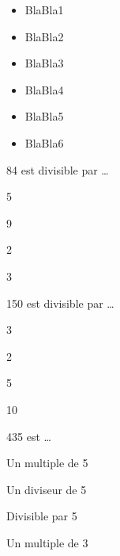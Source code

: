 \begin{acquis} %
\begin{itemize}
\item BlaBla1
\item BlaBla2
\item BlaBla3
\item BlaBla4
\item BlaBla5
\item BlaBla6
\end{itemize}
\end{acquis}


\begin{QCM}
  \begin{GroupeQCM} 
    \begin{exercice}
      84 est divisible par \ldots
      \begin{ChoixQCM}{4}
      \item 5
      \item 9
      \item 2
      \item3
      \end{ChoixQCM}
\begin{corrige}
   \end{corrige}
    \end{exercice}

    \begin{exercice}
      150 est divisible par \ldots
      \begin{ChoixQCM}{4}
      \item 3
      \item 2
      \item 5
      \item 10
      \end{ChoixQCM}
\begin{corrige}
   \end{corrige}
    \end{exercice}
    
    \begin{exercice}
      435 est \ldots
      \begin{ChoixQCM}{4}
      \item Un multiple de 5
      \item Un diviseur de 5
      \item Divisible par 5
      \item Un multiple de 3
      \end{ChoixQCM}
\begin{corrige}
   \end{corrige}
    \end{exercice}


\end{GroupeQCM}
\end{QCM}
